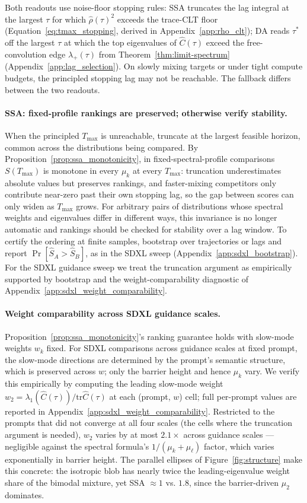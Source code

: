 \documentclass{article}
\newcommand{\tr}{\mathrm{tr}}
\begin{document}
Both readouts use noise-floor stopping rules: SSA truncates the lag integral at the largest $\tau$ for which $\hat\rho(\tau)^2$ exceeds the trace-CLT floor (Equation~\ref{eq:tmax_stopping}, derived in Appendix~\ref{app:rho_clt}); DA reads $\tau^*$ off the largest $\tau$ at which the top eigenvalues of $\hat C(\tau)$ exceed the free-convolution edge $\lambda_+(\tau)$ from Theorem~\ref{thm:limit-spectrum} (Appendix~\ref{app:lag_selection}). On slowly mixing targets or under tight compute budgets, the principled stopping lag may not be reachable. The fallback differs between the two readouts.

\paragraph{SSA: fixed-profile rankings are preserved; otherwise verify stability.}
When the principled $T_{\max}$ is unreachable, truncate at the largest feasible horizon, common across the distributions being compared. By Proposition~\ref{prop:ssa_monotonicity}, in fixed-spectral-profile comparisons $S(T_{\max})$ is monotone in every $\mu_k$ at every $T_{\max}$: truncation underestimates absolute values but preserves rankings, and faster-mixing competitors only contribute near-zero past their own stopping lag, so the gap between scores can only widen as $T_{\max}$ grows. For arbitrary pairs of distributions whose spectral weights and eigenvalues differ in different ways, this invariance is no longer automatic and rankings should be checked for stability over a lag window. To certify the ordering at finite samples, bootstrap over trajectories or lags and report $\Pr[\hat S_A > \hat S_B]$, as in the SDXL sweep (Appendix~\ref{app:sdxl_bootstrap}). For the SDXL guidance sweep we treat the truncation argument as empirically supported by bootstrap and the weight-comparability diagnostic of Appendix~\ref{app:sdxl_weight_comparability}.

\paragraph{Weight comparability across SDXL guidance scales.}
Proposition~\ref{prop:ssa_monotonicity}'s ranking guarantee holds with slow-mode weights $w_k$ fixed. For SDXL comparisons across guidance scales at fixed prompt, the slow-mode directions are determined by the prompt's semantic structure, which is preserved across $w$; only the barrier height and hence $\mu_k$ vary. We verify this empirically by computing the leading slow-mode weight $w_2 = \lambda_1(\hat C(\tau))/\tr\hat C(\tau)$ at each (prompt, $w$) cell; full per-prompt values are reported in Appendix~\ref{app:sdxl_weight_comparability}. Restricted to the prompts that did not converge at all four scales (the cells where the truncation argument is needed), $w_2$ varies by at most $2.1\times$ across guidance scales — negligible against the spectral formula's $1/(\mu_k+\mu_\ell)$ factor, which varies exponentially in barrier height. The parallel ellipses of Figure~\ref{fig:structure} make this concrete: the isotropic blob has nearly twice the leading-eigenvalue weight share of the bimodal mixture, yet SSA $\approx 1$ vs. $1.8$, since the barrier-driven $\mu_2$ dominates.
\end{document}
